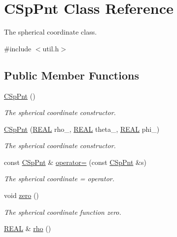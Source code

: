 \hypertarget{classCSpPnt}{\section{C\-Sp\-Pnt Class Reference}
\label{classCSpPnt}
}


The spherical coordinate class.  




{\ttfamily \#include $<$util.\-h$>$}

\subsection*{Public Member Functions}
\begin{DoxyCompactItemize}
\item 
\hyperlink{classCSpPnt_ab2366cfde717accefce56fc72aa5a2ed}{C\-Sp\-Pnt} ()
\begin{DoxyCompactList}\small\item\em The spherical coordinate constructor. \end{DoxyCompactList}\item 
\hyperlink{classCSpPnt_a2d035000bbff43189d79affc0447a9a3}{C\-Sp\-Pnt} (\hyperlink{util_8h_a5821460e95a0800cf9f24c38915cbbde}{R\-E\-A\-L} rho\-\_\-, \hyperlink{util_8h_a5821460e95a0800cf9f24c38915cbbde}{R\-E\-A\-L} theta\-\_\-, \hyperlink{util_8h_a5821460e95a0800cf9f24c38915cbbde}{R\-E\-A\-L} phi\-\_\-)
\begin{DoxyCompactList}\small\item\em The spherical coordinate constructor. \end{DoxyCompactList}\item 
const \hyperlink{classCSpPnt}{C\-Sp\-Pnt} \& \hyperlink{classCSpPnt_aee31a3b97c734fa150f1a33daadd6dfc}{operator=} (const \hyperlink{classCSpPnt}{C\-Sp\-Pnt} \&s)
\begin{DoxyCompactList}\small\item\em The spherical coordinate = operator. \end{DoxyCompactList}\item 
void \hyperlink{classCSpPnt_a9525366e1c144421d07c0a1485256f82}{zero} ()
\begin{DoxyCompactList}\small\item\em The spherical coordinate function zero. \end{DoxyCompactList}\item 
\hyperlink{util_8h_a5821460e95a0800cf9f24c38915cbbde}{R\-E\-A\-L} \& \hyperlink{classCSpPnt_af6364f003b923aa77c880869d27caa64}{rho} ()

\end{DoxyCompactItemize}
